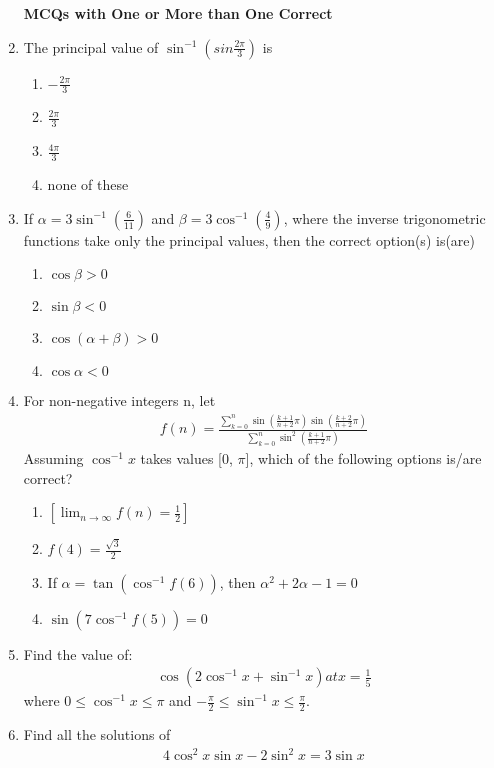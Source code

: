\begin{enumerate}[label=\arabic*.,ref=\thesubsection.\theenumi]
\textbf{MCQs with One or More than One Correct}

\item The principal value of $\sin^{-1}(sin\frac{2\pi}{3})$ is
\begin{enumerate}
\item $-\frac{2\pi}{3}$
\item $\frac{2\pi}{3}$
\item $\frac{4\pi}{3}$
\item none of these
\end{enumerate}

\item If $\alpha = 3\sin^{-1}(\frac{6}{11})$ and $\beta = 3\cos^{-1}(\frac{4}{9})$, where the inverse trigonometric functions take only the principal values, then the correct option(s) is(are)
\begin{enumerate}   
\item $\cos\beta > 0$
\item $\sin\beta < 0$
\item $\cos(\alpha + \beta) > 0$
\item $\cos\alpha < 0$
\end{enumerate}

\item For non-negative integers n, let
\begin{align*}
f(n) = \frac{\sum_{k=0}^{n}\sin(\frac{k+1}{n+2}\pi)\sin(\frac{k+2}{n+2}\pi)}{\sum_{k=0}^{n}\sin^2(\frac{k+1}{n+2}\pi)}
\end{align*}
Assuming $\cos^{-1}x$ takes values [0, $\pi$], which of the following options is/are correct?
\begin{enumerate}
\item $[ \lim_{n \to \infty} f(n) = \frac{1}{2}]$
\item $f(4) = \frac{\sqrt{3}}{2}$
\item If $\alpha = \tan(\cos^{-1}{f(6)})$, then $\alpha^2 + 2\alpha - 1 = 0$
\item $\sin(7\cos^{-1}{f(5)}) = 0$
\end {enumerate}

\item Find the value of: 
\begin{align*}
\cos(2\cos^{-1}{x} + \sin^{-1}{x}) at x = \frac{1}{5}
\end{align*}
where $0 \leq \cos^{-1}{x} \leq \pi$ and $-\frac{\pi}{2} \leq \sin^{-1}{x} \leq \frac{\pi}{2}$.

\item Find all the solutions of 
\begin{align*}
4\cos^{2}x \sin x - 2\sin^{2}x = 3\sin x
\end{align*} 


\end{enumerate}
